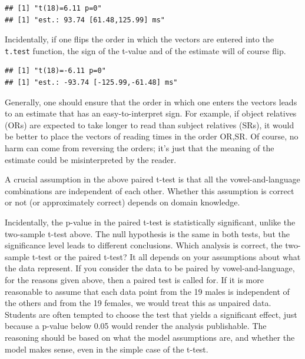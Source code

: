 \documentclass[
  12pt,
]{krantz}
\newenvironment{Shaded}{\begin{snugshade}}{\end{snugshade}}
\newcommand{\AttributeTok}[1]{\textcolor[rgb]{0.77,0.63,0.00}{#1}}
\newcommand{\ConstantTok}[1]{\textcolor[rgb]{0.00,0.00,0.00}{#1}}
\newcommand{\FunctionTok}[1]{\textcolor[rgb]{0.00,0.00,0.00}{#1}}
\newcommand{\NormalTok}[1]{#1}
\newcommand{\OtherTok}[1]{\textcolor[rgb]{0.56,0.35,0.01}{#1}}
\newcommand{\SpecialCharTok}[1]{\textcolor[rgb]{0.00,0.00,0.00}{#1}}
\theoremstyle{definition}
\theoremstyle{definition}
\theoremstyle{definition}
\theoremstyle{definition}
\theoremstyle{remark}
\begin{document}
\begin{verbatim}
## [1] "t(18)=6.11 p=0"
## [1] "est.: 93.74 [61.48,125.99] ms"
\end{verbatim}

Incidentally, if one flips the order in which the vectors are entered into the \texttt{t.test} function, the sign of the t-value and of the estimate will of course flip.

\begin{Shaded}
\end{Shaded}

\begin{verbatim}
## [1] "t(18)=-6.11 p=0"
## [1] "est.: -93.74 [-125.99,-61.48] ms"
\end{verbatim}

Generally, one should ensure that the order in which one enters the vectors leads to an estimate that has an easy-to-interpret sign. For example, if object relatives (ORs) are expected to take longer to read than subject relatives (SRs), it would be better to place the vectors of reading times in the order OR,SR. Of course, no harm can come from reversing the orders; it's just that the meaning of the estimate could be misinterpreted by the reader.

A crucial assumption in the above paired t-test is that all the vowel-and-language combinations are independent of each other. Whether this assumption is correct or not (or approximately correct) depends on domain knowledge.

Incidentally, the p-value in the paired t-test is statistically significant, unlike the two-sample t-test above. The null hypothesis is the same in both tests, but the significance level leads to different conclusions. Which analysis is correct, the two-sample t-test or the paired t-test? It all depends on your assumptions about what the data represent. If you consider the data to be paired by vowel-and-language, for the reasons given above, then a paired test is called for. If it is more reasonable to assume that each data point from the 19 males is independent of the others and from the 19 females, we would treat this as unpaired data. Students are often tempted to choose the test that yields a significant effect, just because a p-value below 0.05 would render the analysis publishable. The reasoning should be based on what the model assumptions are, and whether the model makes sense, even in the simple case of the t-test.
\end{document}
